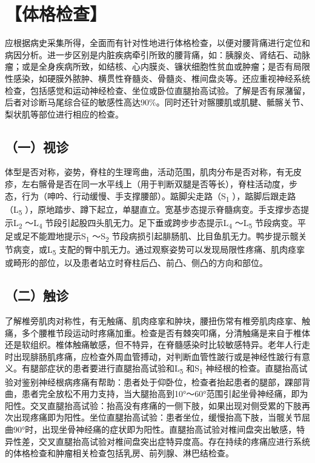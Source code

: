 \section{【体格检查】}

应根据病史采集所得，全面而有针对性地进行体格检查，以便对腰背痛进行定位和病因分析。进一步区别是内脏疾病牵引所致的腰背痛，如：胰腺炎、肾结石、动脉瘤；或是全身疾病所致，如结核、心内膜炎、镰状细胞性贫血或肿瘤；是否有局限性感染，如硬膜外脓肿、横贯性脊髓炎、骨髓炎、椎间盘炎等。还应重视神经系统检查，包括感觉和运动神经检查、坐位或卧位直腿抬高试验。了解是否有尿潴留，后者对诊断马尾综合征的敏感性高达90\%。同时还针对髂腰肌或肌腱、骶髂关节、梨状肌等部位进行相应的检查。

\subsection{（一）视诊}

体型是否对称，姿势，脊柱的生理弯曲，活动范围，肌肉分布是否对称，有无皮疹，左右髂骨是否在同一水平线上（用于判断双腿是否等长），脊柱活动度，步态，行为（呻吟、行动缓慢、手支撑腰部）。踮脚尖走路（S\textsubscript{1}
），踮脚后跟走路（L\textsubscript{5}
），原地踏步、蹲下起立，单腿直立。宽基步态提示脊髓病变。手支撑步态提示L\textsubscript{2}
～L\textsubscript{4}
节段引起股四头肌无力。足下垂或跨步步态提示L\textsubscript{4}
～L\textsubscript{5} 节段病变。平足或足不能蹬地提示S\textsubscript{1}
～S\textsubscript{2}
节段病损引起腓肠肌、比目鱼肌无力。鸭步提示髋关节病变，或L\textsubscript{5}
支配的臀中肌无力。通过观察姿势可以发现局限性疼痛、肌肉痉挛或畸形的部位，以及患者站立时脊柱后凸、前凸、侧凸的方向和部位。

\subsection{（二）触诊}

了解椎旁肌肉对称性，有无触痛、肌肉痉挛和肿块，腰扭伤常有椎旁肌肉痉挛、触痛，多个腰椎节段运动时疼痛加重。检查是否有棘突叩痛，分清触痛是来自于椎体还是软组织。椎体触痛敏感，但不特异，在脊髓感染时比较敏感特异。老年人行走时出现腓肠肌疼痛，应检查外周血管搏动，对判断血管性跛行或是神经性跛行有意义。有腿部症状的患者要进行直腿抬高试验和L\textsubscript{5}
和S\textsubscript{1}
神经根的检查。直腿抬高试验对鉴别神经根病疼痛有帮助：患者处于仰卧位，检查者抬起患者的腿部，踝部背曲，患者完全放松不用力支持，当大腿抬高到10°～60°范围引起坐骨神经痛，即为阳性。交叉直腿抬高试验：抬高没有疼痛的一侧下肢，如果出现对侧受累的下肢再次出现疼痛即为阳性。坐位直腿抬高试验：患者坐位，缓慢抬高下肢，当髋关节屈曲90°时，出现坐骨神经痛的症状即为阳性。直腿抬高试验对椎间盘突出敏感，特异性差，交叉直腿抬高试验对椎间盘突出症特异度高。存在持续的疼痛应进行系统的体格检查和肿瘤相关检查包括乳房、前列腺、淋巴结检查。

